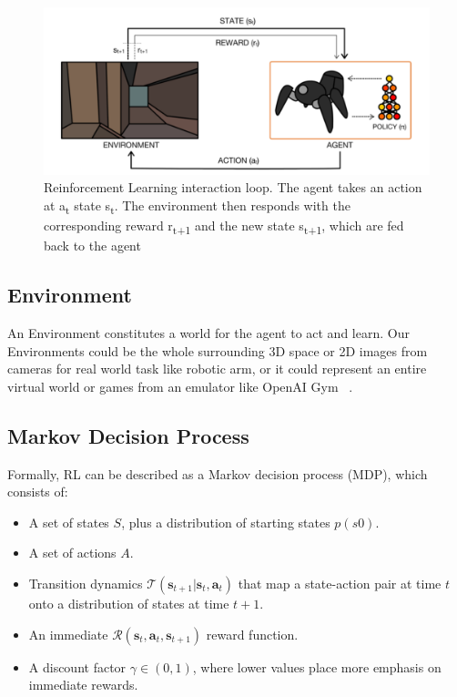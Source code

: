 \begin{figure}
\begin{center}
  \includegraphics[width=.5\linewidth]{figures/Agent-Env.png}
  \caption{Reinforcement Learning interaction loop. The agent takes an action at a\textsubscript{t} state s\textsubscript{t}. The environment then responds with the corresponding reward r\textsubscript{t+1} and the new state s\textsubscript{t+1}, which are fed back to the agent \parencite{arulkumaran2017brief}}
  \label{fig:Agent_Env}
\end{center}
\end{figure}

\subsection{Environment} \label{Environment}
An Environment constitutes a world for the agent to act and learn. Our Environments could be the whole surrounding 3D space or 2D images from cameras for real world task like robotic arm, or it could represent an entire virtual world or games from an emulator like OpenAI Gym ~\parencite{brockman2016openai}.


\subsection{Markov Decision Process}
Formally, RL can be described as a Markov decision process (MDP), which consists of:

\begin{itemize}
  \item A set of states \(S\), plus a distribution of starting states \(p(s0)\).
  \item A set of actions \(A\).
  \item Transition dynamics $ \mathcal{T}\left(\mathbf{s}_{t+1} | \mathbf{s}_{t}, \mathbf{a}_{t}\right) $ that map a state-action pair at time \(t\) onto a distribution of states at time \(t+1\).
  \item An immediate $ \mathcal{R}\left(\mathbf{s}_{t}, \mathbf{a}_{t}, \mathbf{s}_{t+1}\right) $ reward function.
  \item A discount factor \(\gamma \in(0,1)\), where lower values place more emphasis on immediate rewards.
\end{itemize}

